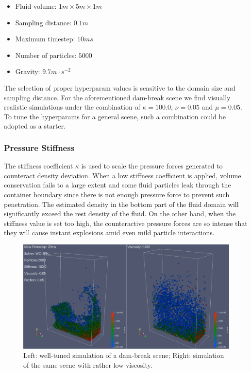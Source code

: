 \documentclass[
	11pt, 
	DIV10,
	ngerman,
	a4paper, 
	oneside, 
	headings=normal, 
	captions=tableheading,
	final, 
	numbers=noenddot
]{scrartcl}
\begin{document}
\begin{itemize}
    \item Fluid volume: $ 1m \times 5m \times 1m $
    \item Sampling distance: $ 0.1m $
    \item Maximum timestep: $ 10ms $
    \item Number of particles: $ 5000 $
    \item Gravity: $ 9.7m \cdot s^{-2} $
\end{itemize}

The selection of proper hyperparam values is sensitive to the domain size and sampling distance. For the aforementioned dam-break scene we find visually realistic simulations under the combination of $ \kappa = 100.0 $, $ \nu = 0.05 $ and $ \mu = 0.05 $. To tune the hyperparams for a general scene, such a combination could be adopted as a starter.

\subsubsection{Pressure Stiffness}

The stiffness coefficient $ \kappa $ is used to scale the pressure forces generated to counteract density deviation. When a low stiffness coefficient is applied, volume conservation fails to a large extent and some fluid particles leak through the container boundary since there is not enough pressure force to prevent such penetration. The estimated density in the bottom part of the fluid domain will significantly exceed the rest density of the fluid. On the other hand, when the stiffness value is set too high, the counteractive pressure forces are so intense that they will cause instant explosions amid even mild particle interactions.

\begin{figure}[h]
    \centering
    \includegraphics[width=.6\textwidth]{pics/wcsph_viscosity.png}
    \caption{Left: well-tuned simulation of a dam-break scene; Right: simulation of the same scene with rather low viscosity.}
    \label{fig:visco}
\end{figure}
\end{document}
